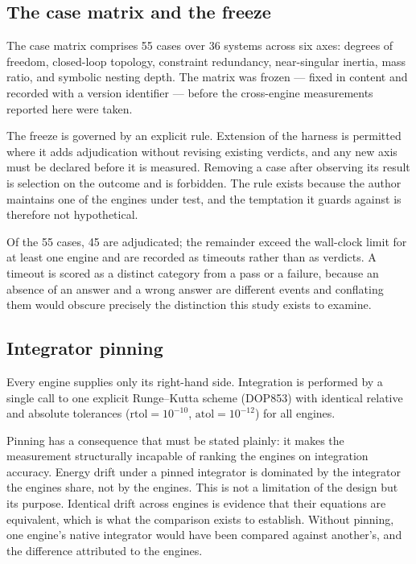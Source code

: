 \documentclass[review,12pt]{elsarticle}
\begin{document}
\subsection{The case matrix and the freeze}\label{sec:matrix}
The case matrix comprises 55 cases over 36 systems across six axes: degrees of
freedom, closed-loop topology, constraint redundancy, near-singular inertia,
mass ratio, and symbolic nesting depth. The matrix was frozen --- fixed in
content and recorded with a version identifier --- before the cross-engine
measurements reported here were taken.

The freeze is governed by an explicit rule. Extension of the harness is
permitted where it adds adjudication without revising existing verdicts, and any
new axis must be declared before it is measured. Removing a case after observing
its result is selection on the outcome and is forbidden. The rule exists because
the author maintains one of the engines under test, and the temptation it guards
against is therefore not hypothetical.

Of the 55 cases, 45 are adjudicated; the remainder exceed the wall-clock limit
for at least one engine and are recorded as timeouts rather than as verdicts. A
timeout is scored as a distinct category from a pass or a failure, because an
absence of an answer and a wrong answer are different events and conflating them
would obscure precisely the distinction this study exists to examine.

\subsection{Integrator pinning}\label{sec:pinning}
Every engine supplies only its right-hand side. Integration is performed by a
single call to one explicit Runge--Kutta scheme (DOP853) with identical relative
and absolute tolerances ($\mathrm{rtol}=10^{-10}$, $\mathrm{atol}=10^{-12}$) for
all engines.

Pinning has a consequence that must be stated plainly: it makes the measurement
structurally incapable of ranking the engines on integration accuracy. Energy
drift under a pinned integrator is dominated by the integrator the engines
share, not by the engines. This is not a limitation of the design but its
purpose. Identical drift across engines is evidence that their equations are
equivalent, which is what the comparison exists to establish. Without pinning,
one engine's native integrator would have been compared against another's, and
the difference attributed to the engines.
\end{document}
